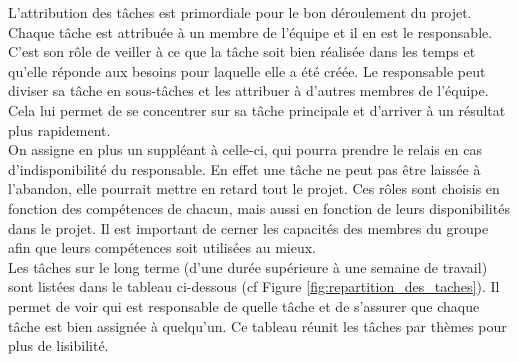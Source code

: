 

L'attribution des tâches est primordiale pour le bon déroulement du projet.
Chaque tâche est attribuée à un membre de l'équipe et il en est le responsable.
C'est son rôle de veiller à ce que la tâche soit bien réalisée dans les temps et qu'elle réponde aux besoins pour laquelle elle a été créée.
Le responsable peut diviser sa tâche en sous-tâches et les attribuer à d'autres membres de l'équipe.
Cela lui permet de se concentrer sur sa tâche principale et d'arriver à un résultat plus rapidement.
\\

On assigne en plus un suppléant à celle-ci, qui pourra prendre le relais en cas d'indisponibilité du responsable.
En effet une tâche ne peut pas être laissée à l'abandon, elle pourrait mettre en retard tout le projet.
Ces rôles sont choisis en fonction des compétences de chacun, mais aussi en fonction de leurs disponibilités dans le projet.
Il est important de cerner les capacités des membres du groupe afin que leurs compétences soit utilisées au mieux.
\\

Les tâches sur le long terme (d'une durée supérieure à une semaine de travail)
sont listées dans le tableau ci-dessous (cf Figure \ref*{fig:repartition_des_taches}).
Il permet de voir qui est responsable de quelle tâche et de s'assurer que chaque tâche est bien assign\'ee à quelqu'un.
Ce tableau réunit les tâches par thèmes pour plus de lisibilité.


